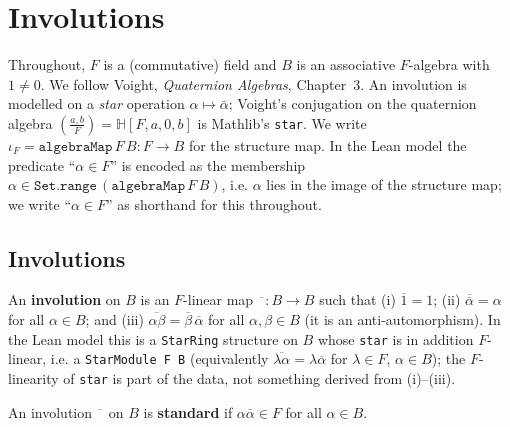 


\section{Involutions}

Throughout, $F$ is a (commutative) field and $B$ is an associative $F$-algebra
with $1 \neq 0$. We follow Voight, \emph{Quaternion Algebras}, Chapter~3. An
involution is modelled on a \emph{star} operation $\alpha \mapsto \bar\alpha$;
Voight's conjugation on the quaternion algebra $\left(\frac{a,b}{F}\right) =
\mathbb{H}[F,a,0,b]$ is Mathlib's \texttt{star}. We write $\iota_F = \mathtt{algebraMap}\,F\,B \colon F \to B$
for the structure map. In the Lean model the predicate ``$\alpha \in F$'' is
encoded as the membership $\alpha \in \mathtt{Set.range}\,(\mathtt{algebraMap}\,F\,B)$,
i.e. $\alpha$ lies in the image of the structure map; we write ``$\alpha \in F$''
as shorthand for this throughout.

\subsection{Involutions}

\begin{definition}[Involution]
    \label{def:involution}
    An \textbf{involution} on $B$ is an $F$-linear map
    $\overline{\phantom{a}} \colon B \to B$ such that
    (i) $\overline{1} = 1$;
    (ii) $\overline{\overline{\alpha}} = \alpha$ for all $\alpha \in B$; and
    (iii) $\overline{\alpha\beta} = \overline{\beta}\,\overline{\alpha}$ for all
    $\alpha, \beta \in B$ (it is an anti-automorphism).
    In the Lean model this is a \texttt{StarRing} structure on $B$ whose
    \texttt{star} is in addition $F$-linear, i.e. a \texttt{StarModule F B}
    (equivalently $\overline{\lambda\alpha} = \lambda\overline{\alpha}$ for
    $\lambda \in F$, $\alpha \in B$); the $F$-linearity of \texttt{star} is part of
    the data, not something derived from (i)--(iii).
\end{definition}

\begin{definition}
    \label{def:standard-involution}
    An involution $\overline{\phantom{a}}$ on $B$ is \textbf{standard} if
    $\alpha\overline{\alpha} \in F$ for all $\alpha \in B$.
\end{definition}

